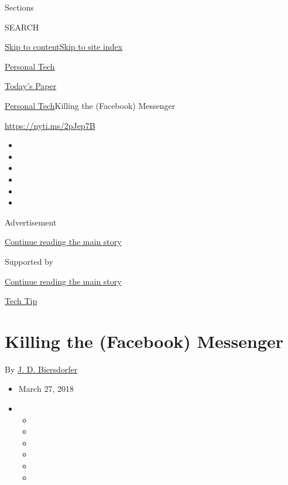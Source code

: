 Sections

SEARCH

\protect\hyperlink{site-content}{Skip to
content}\protect\hyperlink{site-index}{Skip to site index}

\href{https://www.nytimes3xbfgragh.onion/section/technology/personaltech}{Personal
Tech}

\href{https://myaccount.nytimes3xbfgragh.onion/auth/login?response_type=cookie\&client_id=vi}{}

\href{https://www.nytimes3xbfgragh.onion/section/todayspaper}{Today's
Paper}

\href{/section/technology/personaltech}{Personal Tech}\textbar{}Killing
the (Facebook) Messenger

\url{https://nyti.ms/2pJep7B}

\begin{itemize}
\item
\item
\item
\item
\item
\item
\end{itemize}

Advertisement

\protect\hyperlink{after-top}{Continue reading the main story}

Supported by

\protect\hyperlink{after-sponsor}{Continue reading the main story}

\href{/column/tech-tip}{Tech Tip}

\hypertarget{killing-the-facebook-messenger}{%
\section{Killing the (Facebook)
Messenger}\label{killing-the-facebook-messenger}}

By \href{http://www.nytimes3xbfgragh.onion/by/j-d-biersdorfer}{J. D.
Biersdorfer}

\begin{itemize}
\item
  March 27, 2018
\item
  \begin{itemize}
  \item
  \item
  \item
  \item
  \item
  \item
  \end{itemize}
\end{itemize}

